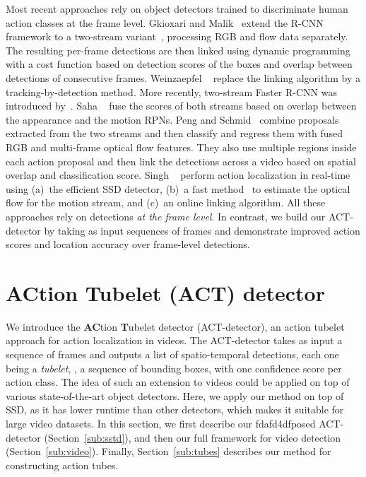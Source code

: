\documentclass[10pt,twocolumn,letterpaper]{article}
\begin{document}
Most recent approaches rely on object detectors trained to discriminate human action classes at the frame level. Gkioxari and Malik~\cite{Gkioxari15cvpr} extend the R-CNN framework to a two-stream variant~\cite{Simonyan2014nips}, processing RGB and flow data separately. The resulting per-frame detections are then linked using dynamic programming with a cost function based on detection scores of the boxes and overlap between detections of consecutive frames. Weinzaepfel \etal~\cite{Weinzaepfel15iccv} replace the linking algorithm by a tracking-by-detection method. More recently, two-stream Faster R-CNN was introduced by~\cite{Peng16eccv,Suman16bmvc}. Saha \etal~\cite{Suman16bmvc} fuse the scores of both streams based on overlap between the appearance and the motion RPNs. Peng and Schmid~\cite{Peng16eccv} combine proposals extracted from the two streams and then classify and regress them with fused RGB and multi-frame optical flow features. They also use multiple regions inside each action proposal and then link the detections across a video based on spatial overlap and classification score. Singh \etal~\cite{singh16arxiv} perform action localization in real-time using (a)~the efficient SSD detector, (b)~a fast method~\cite{kroeger16eccv} to estimate the optical flow for the motion stream, and (c)~an online linking algorithm. All these approaches rely on detections \textit{at the frame level}. In contrast, we build our ACT-detector by taking as input sequences of frames and demonstrate improved action scores and location accuracy
over frame-level detections.
 \section{ACtion Tubelet (ACT) detector}
\label{sec:method}

We introduce the {\bf AC}tion {\bf T}ubelet detector (ACT-detector),  an action tubelet approach for action localization in videos. The ACT-detector takes as input a sequence of  frames  and outputs a list of spatio-temporal detections, each one being a \textit{tubelet}, \ie, a sequence of bounding boxes, with one confidence score per action class. The idea of such an extension to videos could be  applied on top of various state-of-the-art object detectors. Here, we apply our method on top of SSD, as it has lower runtime than other detectors, which makes it suitable for large video datasets. In this section, we first describe our fdafd4dfposed ACT-detector (Section~\ref{sub:sstd}), and then our full framework for video detection (Section~\ref{sub:video}). 
Finally, Section~\ref{sub:tubes} describes our method for constructing action tubes.
 
\end{document}
